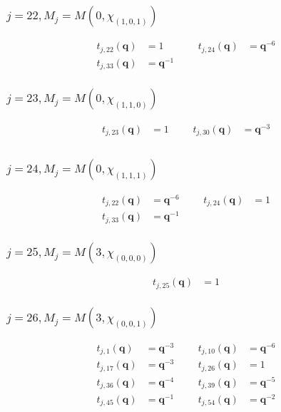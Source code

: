 \subsubsection{$j=22, M_{j}=M(0,\chi_{(1,0,1)})$}
\begin{align*}
t_{j,22}(\boldsymbol{q})&=1 &&& t_{j,24}(\boldsymbol{q})&=\boldsymbol{q}^{-6} \\
t_{j,33}(\boldsymbol{q})&=\boldsymbol{q}^{-1}
\end{align*}

\subsubsection{$j=23, M_{j}=M(0,\chi_{(1,1,0)})$}
\begin{align*}
t_{j,23}(\boldsymbol{q})&=1 &&& t_{j,30}(\boldsymbol{q})&=\boldsymbol{q}^{-3} \\
\end{align*}

\subsubsection{$j=24, M_{j}=M(0,\chi_{(1,1,1)})$}
\begin{align*}
t_{j,22}(\boldsymbol{q})&=\boldsymbol{q}^{-6} &&& t_{j,24}(\boldsymbol{q})&=1 \\
t_{j,33}(\boldsymbol{q})&=\boldsymbol{q}^{-1}
\end{align*}

\subsubsection{$j=25, M_{j}=M(3,\chi_{(0,0,0)})$}
\begin{align*}
t_{j,25}(\boldsymbol{q})&=1
\end{align*}

\subsubsection{$j=26, M_{j}=M(3,\chi_{(0,0,1)})$}
\begin{align*}
t_{j,1}(\boldsymbol{q})&=\boldsymbol{q}^{-3} &&& t_{j,10}(\boldsymbol{q})&=\boldsymbol{q}^{-6} \\
t_{j,17}(\boldsymbol{q})&=\boldsymbol{q}^{-3} &&& t_{j,26}(\boldsymbol{q})&=1 \\
t_{j,36}(\boldsymbol{q})&=\boldsymbol{q}^{-4} &&& t_{j,39}(\boldsymbol{q})&=\boldsymbol{q}^{-5} \\
t_{j,45}(\boldsymbol{q})&=\boldsymbol{q}^{-1} &&& t_{j,54}(\boldsymbol{q})&=\boldsymbol{q}^{-2} \\
\end{align*}

